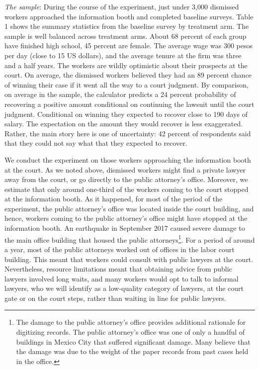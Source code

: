\documentclass[oneside,12pt]{article}
\begin{document}
\emph{The sample}: During the course of the experiment, just under 3,000 dismissed workers approached the information booth and completed baseline surveys. Table 1 shows the summary statistics from the baseline survey by treatment arm. The sample is well balanced across treatment arms. About 68 percent of each group have finished high school, 45 percent are female. The average wage was 300 pesos per day (close to 15 US dollars), and the average tenure at the firm was three and a half years. The workers are wildly optimistic about their prospects at the court. On average, the dismissed workers believed they had an 89 percent chance of winning their case if it went all the way to a court judgment. By comparison, on average in the sample, the calculator predicts a 24 percent probability of recovering a positive amount conditional on continuing the lawsuit until the court judgment. Conditional on winning they expected to recover close to 190 days of salary. The expectation on the amount they would recover is less exaggerated. Rather, the main story here is one of uncertainty: 42 percent of respondents said that they could not say what that they expected to recover. 

We conduct the experiment on those workers approaching the information booth at the court. As we noted above, dismissed workers might find a private lawyer away from the court, or go directly to the public attorney’s office. Moreover, we estimate that only around one-third of the workers coming to the court stopped at the information booth. As it happened, for most of the period of the experiment, the public attorney’s office was located inside the court building, and hence, workers coming to the public attorney’s office might have stopped at the information booth. An earthquake in September 2017 caused severe damage to the main office building that housed the public attorneys\footnote{The damage to the public attorney’s office provides additional rationale for digitizing records. The public attorney’s office was one of only a handful of buildings in Mexico City that suffered significant damage. Many believe that the damage was due to the weight of the paper records from past cases held in the office.}.  For a period of around a year, most of the public attorneys worked out of offices in the labor court building. This meant that workers could consult with public lawyers at the court. Nevertheless, resource limitations meant that obtaining advice from public lawyers involved long waits, and many workers would opt to talk to informal lawyers, who we will identify as a low-quality category of lawyers, at the court gate or on the court steps, rather than waiting in line for public lawyers.
\end{document}
